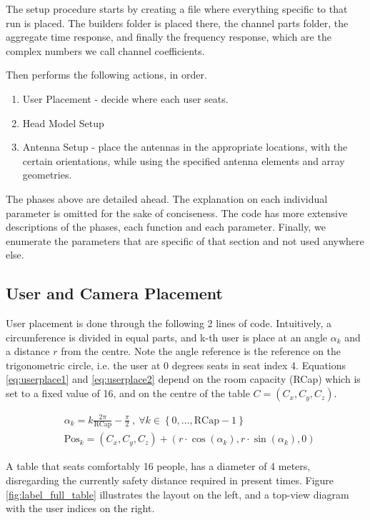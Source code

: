 The setup procedure starts by creating a file where everything specific to that run is placed. The builders folder is placed there, the channel parts folder, the aggregate time response, and finally the frequency response, which are the complex numbers we call channel coefficients.

Then performs the following actions, in order.
\begin{enumerate}
    \item User Placement - decide where each user seats. %
    \item Head Model Setup
    \item Antenna Setup - place the antennas in the appropriate locations, with the certain orientations, while using the specified antenna elements and array geometries. 
\end{enumerate}

The phases above are detailed ahead. The explanation on each individual parameter is omitted for the sake of conciseness. The code has more extensive descriptions of the phases, each function and each parameter. Finally, we enumerate the parameters that are specific of that section and not used anywhere else.


\subsection*{User and Camera Placement}
User placement is done through the following 2 lines of code. Intuitively, a circumference is divided in equal parts, and k-th user is place at an angle $\alpha_k$ and a distance $r$ from the centre. Note the angle reference is the reference on the trigonometric circle, i.e. the user at 0 degrees seats in seat index 4. Equations \ref{eq:userplace1} and \ref{eq:userplace2} depend on the room capacity (RCap) which is set to a fixed value of 16, and on the centre of the table $C = (C_x, C_y, C_z)$.

\begin{align}
    &\alpha_k = k  \frac{2 \pi}{\text{RCap}} - \frac{\pi}{2} \ , \ \forall k \in \left\{0, ..., \text{RCap} - 1\right\} \label{eq:userplace1}\\
    &\text{Pos}_k = (C_x, C_y, C_z) + (r \cdot \cos(\alpha_k), r \cdot \sin(\alpha_k), 0) \label{eq:userplace2}
\end{align}

A table that seats comfortably 16 people, has a diameter of 4 meters, disregarding the currently safety distance required in present times. Figure \ref{fig:label_full_table} illustrates the layout on the left, and a top-view diagram with the user indices on the right.


